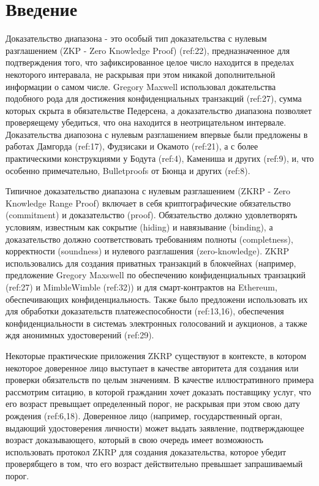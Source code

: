\documentclass[a4paper]{article}
\begin{document}
	\section{Введение}
	Доказательство диапазона - это особый тип доказательства с нулевым разглашением (ZKP - Zero Knowledge Proof) (ref:22), предназначенное для подтверждения того, что зафиксированное целое число находится в пределах некоторого интеравала, не раскрывая при этом никакой дополнительной информации о самом числе.
	Gregory Maxwell использовал докательства подобного рода для достижения конфиденциальных транзакций (ref:27), сумма которых скрыта в обязательстве Педерсена, а доказательство диапазона позволяет проверяещему убедиться, что она находится в неотрицательном интервале.
	Доказательства диапозона с нулевым разглашением впервые были предложены в работах Дамгорда (ref:17), Фудзисаки и Окамото (ref:21), а с более практическими конструкциями у Бодута (ref:4), Камениша и других (ref:9), и, что особенно примечательно, Bulletproofs от Бюнца и других (ref:8).

	Типичное доказательство диапазона с нулевым разглашением (ZKRP - Zero Knowledge Range Proof) включает в себя криптографические обязательство (commitment) и доказательство (proof).
	Обязательство должно удовлетворять условиям, известным как сокрытие (hiding) и навязывание (binding), а доказательство должно соответствовать требованиям полноты (completness), корректности (soundness) и нулевого разглашения (zero-knowledge).
	ZKRP использовались для создания приватных транзакций в блокчейнах (например, предложение Gregory Maxswell по обеспечению конфиденциальных транзацкий (ref:27) и MimbleWimble (ref:32)) и для смарт-контрактов на Ethereum, обеспечивающих конфиденциальность.
	Также было предложени использовать их для обработки доказательств платежеспособности (ref:13,16), обеспечения конфиденциальности в системаъ электронных голосований и аукционов, а также ждя анонимных удостоверений (ref:29).

	Некоторые практические приложения ZKRP существуют в контексте, в котором некоторое доверенное лицо выступает в качестве авторитета для создания или проверки обязательств по целым значениям.
	В качестве иллюстративного примера рассмотрим ситацию, в которой гражданин хочет доказать поставщику услуг, что его возраст превыщает определенный порог, не раскрывая при этом свою дату рождения (ref:6,18).
	Доверенное лицо (например, государственный орган, выдающий удостоверения личности) может выдать заявление, подтверждающее возраст доказывающего, который в свою очередь имеет возможность использовать протокол ZKRP для создания доказательства, которое убедит проверябщего в том, что его возраст действительно превышает запрашиваемый порог.
\end{document}
